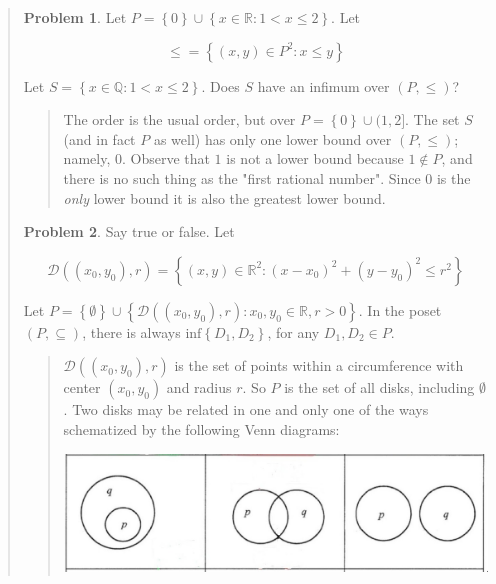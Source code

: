 \documentclass[a4paper, 12pt]{article}
\theoremstyle{definition}
\newtheorem{problem}{Problem}
\theoremstyle{definition}
\theoremstyle{definition}
\begin{document}
\begin{quote}
    \begin{problem}
        Let $P = \left\{ 0 \right\} \cup \left\{ x \in \mathbb{R} : 1 < x \leq 2
        \right\} $. Let 

        $$\leq = \left\{ (x, y) \in P^2 : x \leq y \right\} $$

        Let $S = \left\{ x \in \mathbb{Q} : 1 < x \leq 2 \right\} $. Does $S$
        have an infimum over $(P, \leq) $?
    \end{problem}


\small
\begin{quote}


    The order is the usual order, but over $P = \left\{ 0 \right\}  \cup (1, 2]$.
    The set $S$ (and in fact $P$ as well) has only one lower bound over $(P,
    \leq) $; namely, $0$. Observe that $1$ is not a lower bound because $1
    \not\in P$, and there is no such thing as the "first rational number". Since
    $0$ is the \textit{only} lower bound it is also the greatest lower bound.

\end{quote}
\normalsize


    \begin{problem}
        Say true or false. Let 

        $$\mathcal{D} \left( (x_0, y_0), r \right) = \left\{ (x, y) \in
        \mathbb{R}^2 : (x - x_0)^2 + (y - y_0)^2 \leq r^2 \right\} $$

        Let $P = \left\{ \emptyset \right\} \cup \left\{ \mathcal{D}\left( (x_0,
        y_0), r \right) : x_0, y_0 \in \mathbb{R}, r > 0  \right\} $. In the
        poset $(P, \subseteq ) $, there is always $\text{inf}\left\{ D_1, D_2
        \right\} $, for any $D_1, D_2 \in P$.
    \end{problem}


\small
\begin{quote}

     $\mathcal{D}\left( (x_0, y_0), r \right) $ is the set of
     points within a circumference with center $(x_0, y_0)$ and radius $r$. So
     $P$ is the set of all disks, including $\emptyset$. Two disks may be
     related in one and only one of the ways schematized by the following Venn diagrams:

     \begin{center}
\includegraphics[scale=0.2]{circles}
\end{center}


\end{quote}
\end{quote}
\end{document}
